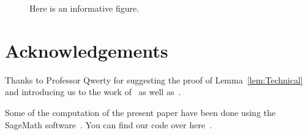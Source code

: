\documentclass[12pt]{article}
\begin{document}
\begin{figure}[ht]
  \centering
  \caption{Here is an informative figure.\label{fig:InformativeFigure}}
\end{figure}



\section*{Acknowledgements}

Thanks to Professor Qwerty for suggesting the proof of
Lemma~\ref{lem:Technical} and introducing us to the work of~\cite{Bj95}
as well as~\cite{winter}.

Some of the computation of the present paper have been done using the 
SageMath software~\cite{sage}. You can find our code over here~\cite{code}.


%
%



\end{document}
